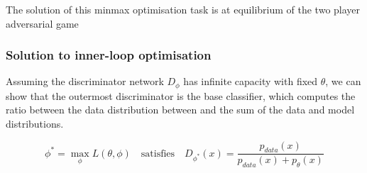 \documentclass[11pt]{article}
\begin{document}
\begin{figure}[H]
    \centering
\end{figure}

The solution of this minmax optimisation task is at equilibrium of the two player adversarial game

\subsubsection{Solution to inner-loop optimisation}

Assuming the discriminator network $D_\phi$ has infinite capacity with fixed $\theta$, we can show that the outermost discriminator is the base classifier, which computes the ratio between the data distribution between and the sum of the data and model distributions.

\begin{equation}
    \phi^* = \max_\phi L(\theta, \phi)\quad \text{satisfies} \quad D_{\phi^*}(x)=\frac{p_{data}(x)}{p_{data}(x)+p_\theta(x)}
\end{equation}
\end{document}

